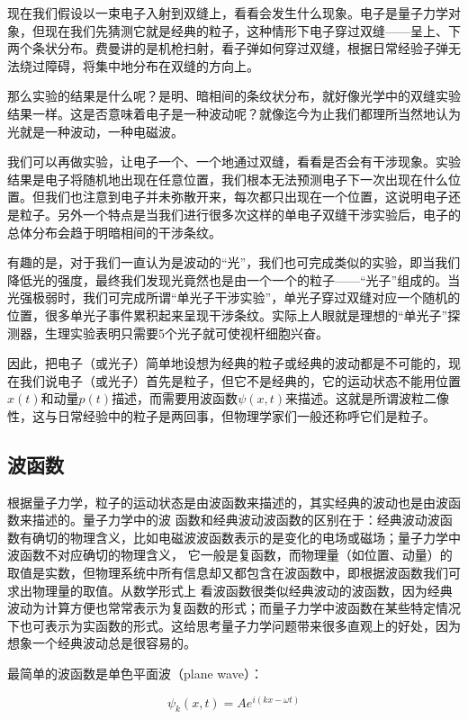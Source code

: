 现在我们假设以一束电子入射到双缝上，看看会发生什么现象。电子是量子力学对象，但现在我们先猜测它就是经典的粒子，这种情形下电子穿过双缝——呈上、下两个条状分布。费曼讲的是机枪扫射，看子弹如何穿过双缝，根据日常经验子弹无法绕过障碍，将集中地分布在双缝的方向上。

那么实验的结果是什么呢？是明、暗相间的条纹状分布，就好像光学中的双缝实验结果一样。这是否意味着电子是一种波动呢？就像迄今为止我们都理所当然地认为光就是一种波动，一种电磁波。

我们可以再做实验，让电子一个、一个地通过双缝，看看是否会有干涉现象。实验结果是电子将随机地出现在任意位置，我们根本无法预测电子下一次出现在什么位置。但我们也注意到电子并未弥散开来，每次都只出现在一个位置，这说明电子还是粒子。另外一个特点是当我们进行很多次这样的单电子双缝干涉实验后，电子的总体分布会趋于明暗相间的干涉条纹。

有趣的是，对于我们一直认为是波动的“光”，我们也可完成类似的实验，即当我们降低光的强度，最终我们发现光竟然也是由一个一个的粒子——“光子”组成的。当光强极弱时，我们可完成所谓“单光子干涉实验”，单光子穿过双缝对应一个随机的位置，很多单光子事件累积起来呈现干涉条纹。实际上人眼就是理想的“单光子”探测器，生理实验表明只需要5个光子就可使视杆细胞兴奋。

因此，把电子（或光子）简单地设想为经典的粒子或经典的波动都是不可能的，现在我们说电子（或光子）首先是粒子，但它不是经典的，它的运动状态不能用位置$x(t)$和动量$p(t)$描述，而需要用波函数$\psi(x,t)$来描述。这就是所谓波粒二像性，这与日常经验中的粒子是两回事，但物理学家们一般还称呼它们是粒子。

\subsection{波函数}

根据量子力学，粒子的运动状态是由波函数来描述的，其实经典的波动也是由波函数来描述的。量子力学中的波
函数和经典波动波函数的区别在于：经典波动波函数有确切的物理含义，比如电磁波波函数表示的是变化的电场或磁场；量子力学中波函数不对应确切的物理含义，
它一般是复函数，而物理量（如位置、动量）的取值是实数，但物理系统中所有信息却又都包含在波函数中，即根据波函数我们可求出物理量的取值。从数学形式上
看波函数很类似经典波动的波函数，因为经典波动为计算方便也常常表示为复函数的形式；而量子力学中波函数在某些特定情况下也可表示为实函数的形式。这给思考量子力学问题带来很多直观上的好处，因为想象一个经典波动总是很容易的。

最简单的波函数是单色平面波（plane wave）：

\begin{equation}
\psi_k (x, t) = A e^{i(kx -\omega t)}
\end{equation}

